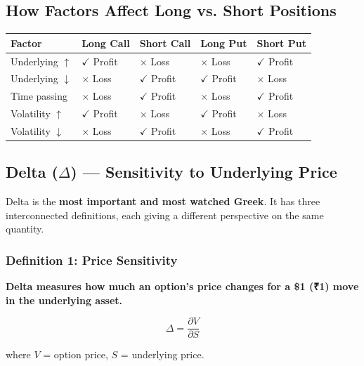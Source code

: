 \documentclass[12pt,openany]{book}
\begin{document}
\subsection{How Factors Affect Long vs. Short Positions}

\begin{center}
\scriptsize
\setlength{\tabcolsep}{3pt}
\begin{tabular}{|L{2.25cm}|L{2.25cm}|L{2.25cm}|L{2.25cm}|L{2.25cm}|}
\hline
\textbf{Factor} & \textbf{Long Call} & \textbf{Short Call} & \textbf{Long Put} & \textbf{Short Put} \\
\hline
Underlying \(\uparrow\) & \(\checkmark\) Profit & \(\times\) Loss & \(\times\) Loss & \(\checkmark\) Profit \\
\hline
Underlying \(\downarrow\) & \(\times\) Loss & \(\checkmark\) Profit & \(\checkmark\) Profit & \(\times\) Loss \\
\hline
Time passing & \(\times\) Loss & \(\checkmark\) Profit & \(\times\) Loss & \(\checkmark\) Profit \\
\hline
Volatility \(\uparrow\) & \(\checkmark\) Profit & \(\times\) Loss & \(\checkmark\) Profit & \(\times\) Loss \\
\hline
Volatility \(\downarrow\) & \(\times\) Loss & \(\checkmark\) Profit & \(\times\) Loss & \(\checkmark\) Profit \\
\hline
\end{tabular}
\end{center}

\subsection{Delta (\texorpdfstring{\(\Delta\)}{Delta}) — Sensitivity to Underlying Price}

Delta is the \textbf{most important and most watched Greek}. It has three interconnected definitions, each giving a different perspective on the same quantity.

\subsubsection{Definition 1: Price Sensitivity}

\textbf{Delta measures how much an option's price changes for a \$1 (₹1) move in the underlying asset.}

\[
\Delta = \frac{\partial V}{\partial S}
\]

where \(V\) = option price, \(S\) = underlying price.
\end{document}

